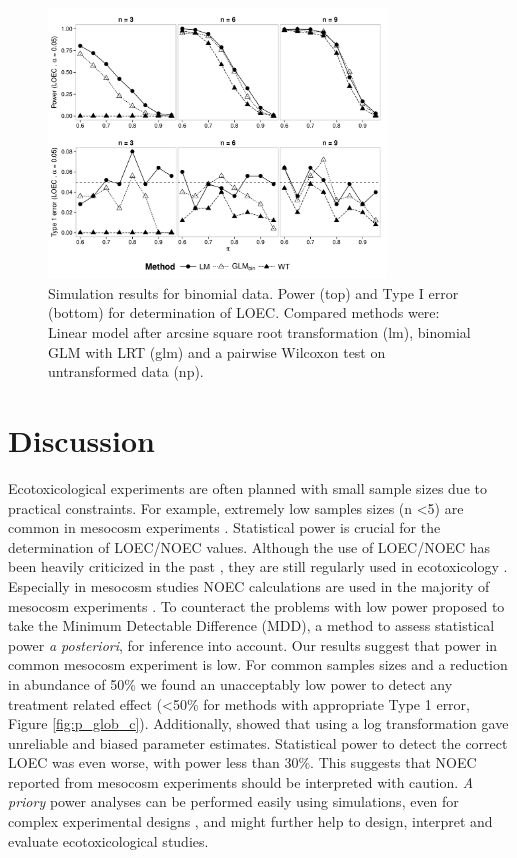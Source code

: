 \documentclass{scrartcl}
\begin{document}
\begin{figure}[h]
  \centering
  \includegraphics[width = 0.8\textwidth]{p_loec_p.pdf}
  \caption{Simulation results for binomial data. Power (top) and Type I error (bottom) for determination of LOEC. Compared methods were: Linear model after arcsine square root transformation (lm), binomial GLM with LRT (glm) and a pairwise Wilcoxon test on untransformed data (np).}
  \label{fig:p_loec_p}
\end{figure}



\newpage
\section{Discussion}

Ecotoxicological experiments are often planned with small sample sizes due to practical constraints. 
For example, extremely low samples sizes (n \textless 5) are common in mesocosm experiments \citep{sanderson_pesticide_2002,szocs_analysing_2015}.
Statistical power is crucial for the determination of LOEC/NOEC values.
Although the use of LOEC/NOEC has been heavily criticized in the past \citep{landis_well_2011},  they are still regularly used in ecotoxicology \citep{jager_bad_2012}.
Especially in mesocosm studies NOEC calculations are used in the majority of mesocosm experiments \citep{brock_minimum_2015,efsa_ppr_guidance_2013}.
To counteract the problems with low power \citet{brock_minimum_2015} proposed to take the Minimum Detectable Difference (MDD), a method to assess statistical power \emph{a posteriori}, for inference into account.
Our results suggest that power in common mesocosm experiment is low.
For common samples sizes and a reduction in abundance of 50\% we found an unacceptably low power to detect any treatment related effect (\textless 50\% for methods with appropriate Type 1 error, Figure \ref{fig:p_glob_c}).
Additionally, \citet{ohara_not_2010} showed that using a log transformation gave unreliable and biased parameter estimates.
Statistical power to detect the correct LOEC was even worse, with power less than 30\%.
This suggests that NOEC reported from mesocosm experiments should be interpreted with caution. 
\emph{A priory} power analyses can be performed easily using simulations, even for complex experimental designs \citep{johnson_power_2014}, and might further help to design, interpret and evaluate ecotoxicological studies.
\end{document}
